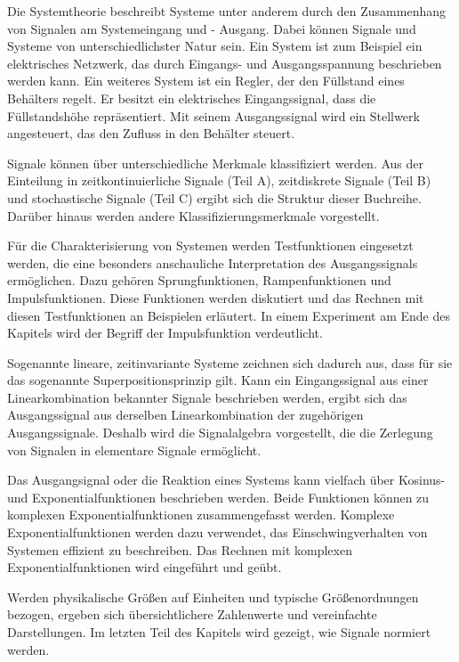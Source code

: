 Die Systemtheorie beschreibt Systeme unter anderem durch den Zusammenhang von Signalen am Systemeingang und - Ausgang. Dabei k\"{o}nnen Signale und Systeme von unterschiedlichster Natur sein. Ein System ist zum Beispiel ein elektrisches Netzwerk, das durch Eingangs- und Ausgangsspannung beschrieben werden kann. Ein weiteres System ist ein Regler, der den F\"{u}llstand eines Beh\"{a}lters regelt. Er besitzt ein elektrisches Eingangssignal, dass die F\"{u}llstandsh\"{o}he repr\"{a}sentiert. Mit seinem Ausgangssignal wird ein Stellwerk angesteuert, das den Zufluss in den Beh\"{a}lter steuert.

\noindent Signale k\"{o}nnen \"{u}ber unterschiedliche Merkmale klassifiziert werden. Aus der Einteilung in zeitkontinuierliche Signale (Teil A), zeitdiskrete Signale (Teil B) und stochastische Signale (Teil C) ergibt sich die Struktur dieser Buchreihe. Dar\"{u}ber hinaus werden andere Klassifizierungsmerkmale vorgestellt.

\noindent F\"{u}r die Charakterisierung von Systemen werden Testfunktionen eingesetzt werden, die eine besonders anschauliche Interpretation des Ausgangssignals erm\"{o}glichen. Dazu geh\"{o}ren Sprungfunktionen, Rampenfunktionen und Impulsfunktionen. Diese Funktionen werden diskutiert und das Rechnen mit diesen Testfunktionen an Beispielen erl\"{a}utert. In einem Experiment am Ende des Kapitels wird der Begriff der Impulsfunktion verdeutlicht.

\noindent Sogenannte lineare, zeitinvariante Systeme zeichnen sich dadurch aus, dass f\"{u}r sie das sogenannte Superpositionsprinzip gilt. Kann ein Eingangssignal aus einer Linearkombination bekannter Signale beschrieben werden, ergibt sich das Ausgangssignal aus derselben Linearkombination der zugeh\"{o}rigen Ausgangssignale. Deshalb wird die Signalalgebra vorgestellt, die die Zerlegung von Signalen in elementare Signale erm\"{o}glicht.

\noindent Das Ausgangsignal oder die Reaktion eines Systems kann vielfach \"{u}ber Kosinus- und Exponentialfunktionen beschrieben werden. Beide Funktionen k\"{o}nnen zu komplexen Exponentialfunktionen zusammengefasst werden. Komplexe Exponentialfunktionen werden dazu verwendet, das Einschwingverhalten von Systemen effizient zu beschreiben. Das Rechnen mit komplexen Exponentialfunktionen wird eingef\"{u}hrt und ge\"{u}bt.

\noindent Werden physikalische Gr\"{o}{\ss}en auf Einheiten und typische Gr\"{o}{\ss}enordnungen bezogen, ergeben sich \"{u}bersichtlichere Zahlenwerte und vereinfachte Darstellungen. Im letzten Teil des Kapitels wird gezeigt, wie Signale normiert werden. 



